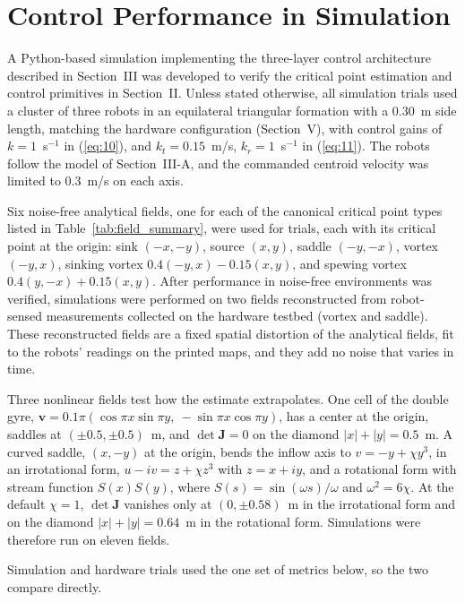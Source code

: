 \documentclass[lettersize,journal]{IEEEtran}
\newcommand{\rev}[1]{#1}
\begin{document}
\section{Control Performance in Simulation}

A Python-based simulation implementing the three-layer control architecture described in Section~III was developed to verify the critical point estimation and control primitives in Section~II. Unless stated otherwise, all simulation trials used a cluster of three robots in an equilateral triangular formation with a \rev{0.30}~m side length, matching the hardware configuration (Section~V), with control gains of $k = 1$~s$^{-1}$ in (\ref{eq:10}), and $k_t = \rev{0.15}$~m/s, $k_r = \rev{1}$~s$^{-1}$ in (\ref{eq:11}). The robots follow the model of Section~III-A, and the commanded centroid velocity was limited to \rev{0.3}~m/s on each axis.

Six noise-free analytical fields, one for each of the canonical critical point types listed in Table~\ref{tab:field_summary}, were used for trials, each with its critical point at the origin: sink $(-x,-y)$, source $(x,y)$, saddle $(-y,-x)$, vortex $(-y,x)$, sinking vortex $0.4(-y,x)-0.15(x,y)$, and spewing vortex $0.4(y,-x)+0.15(x,y)$. After performance in noise-free environments was verified, simulations were performed on two fields reconstructed from robot-sensed measurements collected on the hardware testbed (vortex and saddle). These reconstructed fields are a fixed spatial distortion of the analytical fields, fit to the robots' readings on the printed maps, and they add no noise that varies in time.

Three nonlinear fields test how the estimate extrapolates. One cell of the double gyre, $\mathbf{v} = 0.1\pi(\cos\pi x \sin\pi y,\allowbreak\ -\sin\pi x \cos\pi y)$, has a center at the origin, saddles at $(\pm 0.5, \pm 0.5)$~m, and $\det\mathbf{J} = 0$ on the diamond $|x| + |y| = 0.5$~m. A curved saddle, $(x, -y)$ at the origin, bends the inflow axis to $v = -y + \chi y^3$, in an irrotational form, $u - iv = z + \chi z^3$ with $z = x + iy$, and a rotational form with stream function $S(x)S(y)$, where $S(s) = \sin(\omega s)/\omega$ and $\omega^2 = 6\chi$. At the default $\chi = 1$, $\det\mathbf{J}$ vanishes only at $(0, \pm 0.58)$~m in the irrotational form and on the diamond $|x| + |y| = 0.64$~m in the rotational form. Simulations were therefore run on eleven fields.

Simulation and hardware trials used the one set of metrics below, so the two compare directly.
\end{document}

